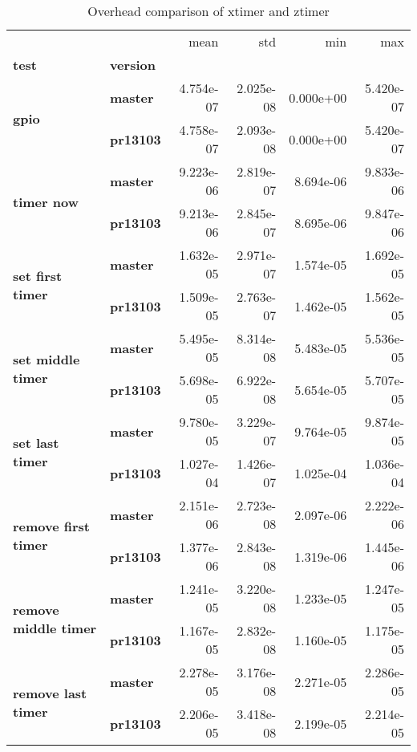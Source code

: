 \begin{table}
\centering
\caption{Overhead comparison of xtimer and ztimer}
\label{fig:xztimer-overhead}
\begin{tabular}{llrrrr}
\toprule
                  &         &      mean &       std &       min &       max \\
\textbf{test} & \textbf{version} &           &           &           &           \\
\midrule
\multirow{2}{*}{\textbf{gpio}} & \textbf{master} & 4.754e-07 & 2.025e-08 & 0.000e+00 & 5.420e-07 \\
                  & \textbf{pr13103} & 4.758e-07 & 2.093e-08 & 0.000e+00 & 5.420e-07 \\
\cline{1-6}
\multirow{2}{*}{\textbf{timer now}} & \textbf{master} & 9.223e-06 & 2.819e-07 & 8.694e-06 & 9.833e-06 \\
                  & \textbf{pr13103} & 9.213e-06 & 2.845e-07 & 8.695e-06 & 9.847e-06 \\
\cline{1-6}
\multirow{2}{*}{\textbf{set first timer}} & \textbf{master} & 1.632e-05 & 2.971e-07 & 1.574e-05 & 1.692e-05 \\
                  & \textbf{pr13103} & 1.509e-05 & 2.763e-07 & 1.462e-05 & 1.562e-05 \\
\cline{1-6}
\multirow{2}{*}{\textbf{set middle timer}} & \textbf{master} & 5.495e-05 & 8.314e-08 & 5.483e-05 & 5.536e-05 \\
                  & \textbf{pr13103} & 5.698e-05 & 6.922e-08 & 5.654e-05 & 5.707e-05 \\
\cline{1-6}
\multirow{2}{*}{\textbf{set last timer}} & \textbf{master} & 9.780e-05 & 3.229e-07 & 9.764e-05 & 9.874e-05 \\
                  & \textbf{pr13103} & 1.027e-04 & 1.426e-07 & 1.025e-04 & 1.036e-04 \\
\cline{1-6}
\multirow{2}{*}{\textbf{remove first timer}} & \textbf{master} & 2.151e-06 & 2.723e-08 & 2.097e-06 & 2.222e-06 \\
                  & \textbf{pr13103} & 1.377e-06 & 2.843e-08 & 1.319e-06 & 1.445e-06 \\
\cline{1-6}
\multirow{2}{*}{\textbf{remove middle timer}} & \textbf{master} & 1.241e-05 & 3.220e-08 & 1.233e-05 & 1.247e-05 \\
                  & \textbf{pr13103} & 1.167e-05 & 2.832e-08 & 1.160e-05 & 1.175e-05 \\
\cline{1-6}
\multirow{2}{*}{\textbf{remove last timer}} & \textbf{master} & 2.278e-05 & 3.176e-08 & 2.271e-05 & 2.286e-05 \\
                  & \textbf{pr13103} & 2.206e-05 & 3.418e-08 & 2.199e-05 & 2.214e-05 \\
\bottomrule
\end{tabular}
\end{table}

